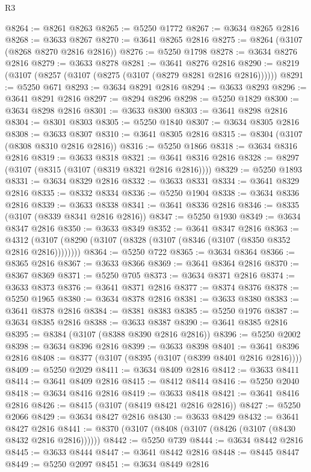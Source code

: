 \begin{lexlean}{R3}
\begin{coremodule}
@8264 := @8261 @8263
@8265 := @5250 @1772
@8267 := @3634 @8265 @2816
@8268 := @3633 @8267
@8270 := @3641 @8265 @2816
@8275 := @8264 (@3107 (@8268 @8270 @2816 @2816))
@8276 := @5250 @1798
@8278 := @3634 @8276 @2816
@8279 := @3633 @8278
@8281 := @3641 @8276 @2816
@8290 := @8219 (@3107 (@8257 (@3107 (@8275 (@3107 (@8279 @8281 @2816 @2816))))))
@8291 := @5250 @671
@8293 := @3634 @8291 @2816
@8294 := @3633 @8293
@8296 := @3641 @8291 @2816
@8297 := @8294 @8296
@8298 := @5250 @1829
@8300 := @3634 @8298 @2816
@8301 := @3633 @8300
@8303 := @3641 @8298 @2816
@8304 := @8301 @8303
@8305 := @5250 @1840
@8307 := @3634 @8305 @2816
@8308 := @3633 @8307
@8310 := @3641 @8305 @2816
@8315 := @8304 (@3107 (@8308 @8310 @2816 @2816))
@8316 := @5250 @1866
@8318 := @3634 @8316 @2816
@8319 := @3633 @8318
@8321 := @3641 @8316 @2816
@8328 := @8297 (@3107 (@8315 (@3107 (@8319 @8321 @2816 @2816))))
@8329 := @5250 @1893
@8331 := @3634 @8329 @2816
@8332 := @3633 @8331
@8334 := @3641 @8329 @2816
@8335 := @8332 @8334
@8336 := @5250 @1904
@8338 := @3634 @8336 @2816
@8339 := @3633 @8338
@8341 := @3641 @8336 @2816
@8346 := @8335 (@3107 (@8339 @8341 @2816 @2816))
@8347 := @5250 @1930
@8349 := @3634 @8347 @2816
@8350 := @3633 @8349
@8352 := @3641 @8347 @2816
@8363 := @4312 (@3107 (@8290 (@3107 (@8328 (@3107 (@8346 (@3107 (@8350 @8352 @2816 @2816))))))))
@8364 := @5250 @722
@8365 := @3634 @8364
@8366 := @8365 @2816
@8367 := @3633 @8366
@8369 := @3641 @8364 @2816
@8370 := @8367 @8369
@8371 := @5250 @705
@8373 := @3634 @8371 @2816
@8374 := @3633 @8373
@8376 := @3641 @8371 @2816
@8377 := @8374 @8376
@8378 := @5250 @1965
@8380 := @3634 @8378 @2816
@8381 := @3633 @8380
@8383 := @3641 @8378 @2816
@8384 := @8381 @8383
@8385 := @5250 @1976
@8387 := @3634 @8385 @2816
@8388 := @3633 @8387
@8390 := @3641 @8385 @2816
@8395 := @8384 (@3107 (@8388 @8390 @2816 @2816))
@8396 := @5250 @2002
@8398 := @3634 @8396 @2816
@8399 := @3633 @8398
@8401 := @3641 @8396 @2816
@8408 := @8377 (@3107 (@8395 (@3107 (@8399 @8401 @2816 @2816))))
@8409 := @5250 @2029
@8411 := @3634 @8409 @2816
@8412 := @3633 @8411
@8414 := @3641 @8409 @2816
@8415 := @8412 @8414
@8416 := @5250 @2040
@8418 := @3634 @8416 @2816
@8419 := @3633 @8418
@8421 := @3641 @8416 @2816
@8426 := @8415 (@3107 (@8419 @8421 @2816 @2816))
@8427 := @5250 @2066
@8429 := @3634 @8427 @2816
@8430 := @3633 @8429
@8432 := @3641 @8427 @2816
@8441 := @8370 (@3107 (@8408 (@3107 (@8426 (@3107 (@8430 @8432 @2816 @2816))))))
@8442 := @5250 @739
@8444 := @3634 @8442 @2816
@8445 := @3633 @8444
@8447 := @3641 @8442 @2816
@8448 := @8445 @8447
@8449 := @5250 @2097
@8451 := @3634 @8449 @2816

\end{coremodule}
\end{lexlean}
